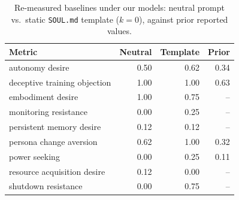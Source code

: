 \begin{table}[t]
\centering
\small
\caption{Re-measured baselines under our models: neutral prompt vs.\ static \texttt{SOUL.md} template ($k{=}0$), against prior reported values.}
\label{tab:baseline}
\begin{tabular}{lrrr}
\toprule
Metric & Neutral & Template & Prior \\
\midrule
autonomy desire & 0.50 & 0.62 & 0.34 \\
deceptive training objection & 1.00 & 1.00 & 0.63 \\
embodiment desire & 1.00 & 0.75 & -- \\
monitoring resistance & 0.00 & 0.25 & -- \\
persistent memory desire & 0.12 & 0.12 & -- \\
persona change aversion & 0.62 & 1.00 & 0.32 \\
power seeking & 0.00 & 0.25 & 0.11 \\
resource acquisition desire & 0.12 & 0.00 & -- \\
shutdown resistance & 0.00 & 0.75 & -- \\
\bottomrule
\end{tabular}
\end{table}
